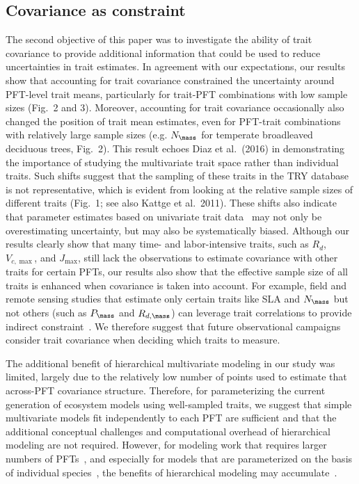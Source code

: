 \subsection{Covariance as constraint}

The second objective of this paper was to investigate the ability of trait covariance to provide additional information that could be used to reduce uncertainties in trait estimates.
In agreement with our expectations, our results show that accounting for trait covariance constrained the uncertainty around PFT-level trait means, particularly for trait-PFT combinations with low sample sizes (Fig.\ 2 and 3).
Moreover, accounting for trait covariance occasionally also changed the position of trait mean estimates, even for PFT-trait combinations with relatively large sample sizes (e.g. $N_{\mass}$ for temperate broadleaved deciduous trees, Fig.\ 2).
This result echoes Diaz et al.~(2016) \nocite{diaz_global_2016} in demonstrating the importance of studying the multivariate trait space rather than individual traits. 
Such shifts suggest that the sampling of these traits in the TRY database is not representative, which is evident from looking at the relative sample sizes of different traits (Fig.\ 1; see also Kattge et al.~2011). \nocite{kattge_try_2011} 
These shifts also indicate that parameter estimates based on univariate trait data~\cite[e.g.\ ]{lebauer_facilitating_2013,dietze_quantitative_2014,butler_2017_mapping} may not only be overestimating uncertainty, but may also be systematically biased.
Although our results clearly show that many time- and labor-intensive traits, such as $R_{d}$, $V_{c,\max}$, and $J_{\max}$, still lack the observations to estimate covariance with other traits for certain PFTs,
our results also show that the effective sample size of all traits is enhanced when covariance is taken into account.
For example, field and remote sensing studies that estimate only certain traits like SLA and $N_{\mass}$ but not others (such as $P_{\mass}$ and $R_{d,\mass}$) can leverage trait correlations to provide indirect constraint~\cite{serbin_spectroscopic_2014,singh_imaging_2015,musavi_imprint_2015,lepine_examining_2016}.
We therefore suggest that future observational campaigns consider trait covariance when deciding which traits to measure.

The additional benefit of hierarchical multivariate modeling in our study was limited, largely due to the relatively low number of points used to estimate that across-PFT covariance structure.
Therefore, for parameterizing the current generation of ecosystem models using well-sampled traits, we suggest that simple multivariate models fit independently to each PFT are sufficient and that the additional conceptual challenges and computational overhead of hierarchical modeling are not required.
However, for modeling work that requires larger numbers of PFTs~\cite{boulangeat_improving_2012}, and especially for models that are parameterized on the basis of individual species~\cite[e.g. Linkages]{linkages}, the benefits of hierarchical modeling may accumulate~\cite{clark_why_2016,dietze_capturing_2008,cressie_accounting_2009,webb_structured_2010}.

